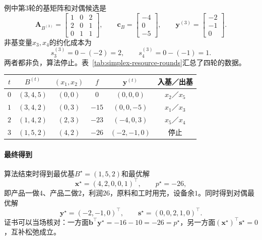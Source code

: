 例中第$3$轮的基矩阵和对偶候选是
\[
 \bm{A}_{B^{(3)}}=\begin{bmatrix}1&0&2\\2&0&1\\0&1&1\end{bmatrix},\qquad
 \bm{c}_B=\begin{bmatrix}-4\\0\\-5\end{bmatrix},\qquad
 \bm{y}^{(3)}=\begin{bmatrix}-2\\-1\\0\end{bmatrix}.
\]
非基变量$x_3,x_4$的约化成本为
\[
 s_3^{(3)}=0-(-2)=2,\qquad s_4^{(3)}=0-(-1)=1.
\]
两者都非负，算法停止。表~\ref{tab:simplex-resource-rounds}汇总了四轮的数据。

\begin{BookInlineTable}
 \centering
 \begin{tabular}{cccccc}
  \toprule
  $t$ & $B^{(t)}$ & $(x_1,x_2)$ & $f$ & $\bm{y}^{(t)}$ & 入基／出基\\
  \midrule
  $0$ & $(3,4,5)$ & $(0,0)$ & $0$ & $(0,0,0)$ & $x_2$／$x_5$\\
  $1$ & $(3,4,2)$ & $(0,3)$ & $-15$ & $(0,0,-5)$ & $x_1$／$x_3$\\
  $2$ & $(1,4,2)$ & $(2,3)$ & $-23$ & $(-4,0,3)$ & $x_5$／$x_4$\\
  $3$ & $(1,5,2)$ & $(4,2)$ & $-26$ & $(-2,-1,0)$ & 停止\\
  \bottomrule
 \end{tabular}
 \caption{资源配置问题在Dantzig规则下的各轮数据。}
 \label{tab:simplex-resource-rounds}
\end{BookInlineTable}

\paragraph{最终得到}
算法结束时得到最优基$B^\star=(1,5,2)$和最优解
\begin{equation}
 \bm{x}^\star=(4,2,0,0,1)^\top,\qquad p^\star=-26,
 \label{eq:simplex-resource-solution}
\end{equation}
即产品一做$4$、产品二做$2$，利润$26$，原料和工时用完，设备余$1$。同时得到对偶最优解
\begin{equation}
 \bm{y}^\star=(-2,-1,0)^\top,\qquad \bm{s}^\star=(0,0,2,1,0)^\top.
 \label{eq:simplex-resource-dual}
\end{equation}
证书可以当场核对：一方面$\bm{b}^\top\bm{y}^\star=-16-10=-26=p^\star$，另一方面$(\bm{x}^\star)^\top\bm{s}^\star=0$，互补松弛成立。

